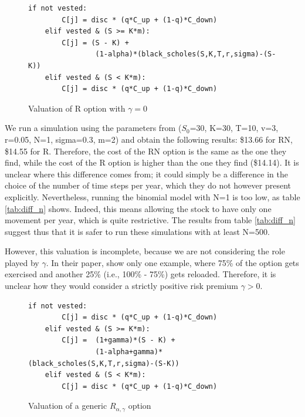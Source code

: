 \vspace*{15pt}
\begin{figure}[H]
    \begin{lstlisting}[breaklines, basicstyle=\ttfamily\small]
    if not vested:                
        C[j] = disc * (q*C_up + (1-q)*C_down)
    elif vested & (S >= K*m): 
        C[j] = (S - K) + 
                (1-alpha)*(black_scholes(S,K,T,r,sigma)-(S-K))
    elif vested & (S < K*m):
        C[j] = disc * (q*C_up + (1-q)*C_down)
    \end{lstlisting}
    \caption{Valuation of R option with $\gamma=0$}
    \label{fig:val_r_gamma0}
\end{figure}
\vspace*{15pt}

 We run a simulation using the parameters from \citet{huang2013dynamic} ($S_0$=30, K=30, T=10, v=3, r=0.05, N=1, sigma=0.3, m=2) and obtain the following results: \$13.66 for RN, \$14.55 for R. Therefore, the cost of the RN option is the same as the one they find, while the cost of the R option is higher than the one they find (\$14.14). It is unclear where this difference comes from; it could simply be a difference in the choice of the number of time steps per year, which they do not however present explicitly. Nevertheless, running the binomial model with N=1 is too low, as table \ref*{tab:diff_n} shows. Indeed, this means allowing the stock to have only one movement per year, which is quite restrictive. The results from table \ref*{tab:diff_n} suggest thus that it is safer to run these simulations with at least N=500.

 

However, this valuation is incomplete, because we are not considering the role played by $\gamma$. In their paper, \citet{huang2013dynamic} show only one example, where 75\% of the option gets exercised and another 25\% (i.e., 100\% - 75\%) gets reloaded. Therefore, it is unclear how they would consider a strictly positive risk premium $\gamma > 0$. 


\vspace*{15pt}
\begin{figure}[h]
    \begin{lstlisting}[breaklines, basicstyle=\ttfamily\small] 
    if not vested:                         
        C[j] = disc * (q*C_up + (1-q)*C_down)
    elif vested & (S >= K*m):                
        C[j] =  (1+gamma)*(S - K) + 
                (1-alpha+gamma)*(black_scholes(S,K,T,r,sigma)-(S-K))
    elif vested & (S < K*m):  
        C[j] = disc * (q*C_up + (1-q)*C_down)
    \end{lstlisting}
    \caption{Valuation of a generic $R_{\alpha, \gamma}$ option}
    \label{fig:val_r}
\end{figure}
\vspace*{15pt}

